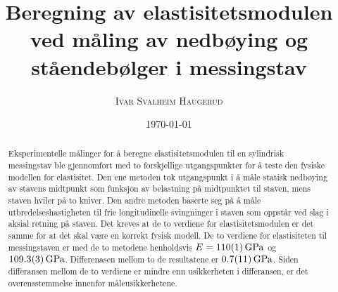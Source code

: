 \documentclass[%
 reprint,
 amsmath,amssymb,
 aps,
 norsk,
 booktabs
]{revtex4-1}
\begin{document}
\title{Beregning av elastisitetsmodulen ved måling av nedbøying og ståendebølger i messingstav}
\author{\textsc{Ivar Svalheim Haugerud}}
\date{\today}

\begin{abstract}
  Eksperimentelle målinger for å beregne elastisitetsmodulen til en sylindrisk messingstav ble gjennomført med to forskjellige utgangspunkter for å teste den fysiske modellen for elastisitet. Den ene metoden tok utgangspunkt i å måle statisk nedbøying av stavens midtpunkt som funksjon av belastning på midtpunktet til staven, mens staven hviler på to kniver. Den andre metoden baserte seg på å måle utbredelseshastigheten til frie longitudinelle svingninger i staven som oppstår ved slag i aksial retning på staven. Det kreves at de to verdiene for elastisitetsmodulen er det samme for at det skal være en korrekt fysisk modell. De to verdiene for elastisiteten til messingstaven er med de to metodene henholdsvis
  $E=\SI{110\pm1}{\giga\pascal}$ og $\SI{109.3\pm0.3}{\giga\pascal}$. Differenasen mellom to de resultatene er $\SI{0.7\pm1.1}{\giga\pascal}$. Siden differansen mellom de to verdiene er mindre enn usikkerheten i differansen, er det overensstemmelse innenfor måleusikkerhetene.
\end{abstract}

\maketitle

\end{document}
